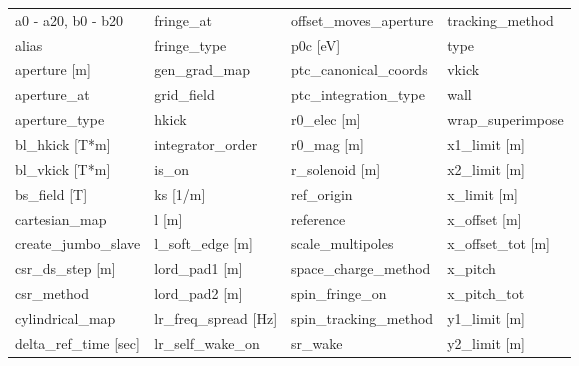  \begin{tabular}{llll} \toprule
a0 - a20, b0 - b20               & fringe_at                        & offset_moves_aperture            & tracking_method                  \\
alias                            & fringe_type                      & p0c [eV]                         & type                             \\
aperture [m]                     & gen_grad_map                     & ptc_canonical_coords             & vkick                            \\
aperture_at                      & grid_field                       & ptc_integration_type             & wall                             \\
aperture_type                    & hkick                            & r0_elec [m]                      & wrap_superimpose                 \\
bl_hkick [T*m]                   & integrator_order                 & r0_mag [m]                       & x1_limit [m]                     \\
bl_vkick [T*m]                   & is_on                            & r_solenoid [m]                   & x2_limit [m]                     \\
bs_field [T]                     & ks [1/m]                         & ref_origin                       & x_limit [m]                      \\
cartesian_map                    & l [m]                            & reference                        & x_offset [m]                     \\
create_jumbo_slave               & l_soft_edge [m]                  & scale_multipoles                 & x_offset_tot [m]                 \\
csr_ds_step [m]                  & lord_pad1 [m]                    & space_charge_method              & x_pitch                          \\
csr_method                       & lord_pad2 [m]                    & spin_fringe_on                   & x_pitch_tot                      \\
cylindrical_map                  & lr_freq_spread [Hz]              & spin_tracking_method             & y1_limit [m]                     \\
delta_ref_time [sec]             & lr_self_wake_on                  & sr_wake                          & y2_limit [m]                     \\

\end{tabular}
